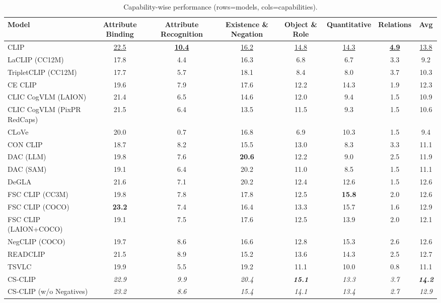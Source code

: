 \begin{table}[t]
  \centering
  \scriptsize
  \caption{Capability-wise performance (rows=models, cols=capabilities).}
  \label{tab:caps_models_rows}
  \begin{adjustbox}{max width=\textwidth}
  \setlength{\tabcolsep}{2pt}
  \begin{tabular}{p{5.0cm}ccccccc}
    \toprule
    Model & Attribute Binding & Attribute Recognition & Existence \& Negation & Object \& Role & Quantitative & Relations & Avg \\
    \midrule
    CLIP & \underline{22.5} & \textbf{\underline{10.4}} & \underline{16.2} & \underline{14.8} & \underline{14.3} & \textbf{\underline{4.9}} & \underline{13.8} \\
    \midrule
    LaCLIP (CC12M) & 17.8 & 4.4 & 16.3 & 6.8 & 6.7 & 3.3 & 9.2 \\
    TripletCLIP (CC12M) & 17.7 & 5.7 & 18.1 & 8.4 & 8.0 & 3.7 & 10.3 \\
    \midrule
    CE CLIP & 19.6 & 7.9 & 17.6 & 12.2 & 14.3 & 1.9 & 12.3 \\
    CLIC CogVLM (LAION) & 21.4 & 6.5 & 14.6 & 12.0 & 9.4 & 1.5 & 10.9 \\
    CLIC CogVLM (PixPR RedCaps) & 21.5 & 6.4 & 13.5 & 11.5 & 9.3 & 1.5 & 10.6 \\
    CLoVe & 20.0 & 0.7 & 16.8 & 6.9 & 10.3 & 1.5 & 9.4 \\
    CON CLIP & 18.7 & 8.2 & 15.5 & 13.0 & 8.3 & 3.3 & 11.1 \\
    DAC (LLM) & 19.8 & 7.6 & \textbf{20.6} & 12.2 & 9.0 & 2.5 & 11.9 \\
    DAC (SAM) & 19.1 & 6.4 & 20.2 & 11.0 & 8.5 & 1.5 & 11.1 \\
    DeGLA & 21.6 & 7.1 & 20.2 & 12.4 & 12.6 & 1.5 & 12.6 \\
    FSC CLIP (CC3M) & 19.8 & 7.8 & 17.8 & 12.5 & \textbf{15.8} & 2.0 & 12.6 \\
    FSC CLIP (COCO) & \textbf{23.2} & 7.4 & 16.4 & 13.3 & 15.7 & 1.6 & 12.9 \\
    FSC CLIP (LAION+COCO) & 19.1 & 7.5 & 17.6 & 12.5 & 13.9 & 2.0 & 12.1 \\
    NegCLIP (COCO) & 19.7 & 8.6 & 16.6 & 12.8 & 15.3 & 2.6 & 12.6 \\
    READCLIP & 21.5 & 8.9 & 15.2 & 13.6 & 14.3 & 2.5 & 12.7 \\
    TSVLC & 19.9 & 5.5 & 19.2 & 11.1 & 10.0 & 0.8 & 11.1 \\
    \midrule
    CS-CLIP & \emph{22.9} & \emph{9.9} & \emph{20.4} & \textbf{\emph{15.1}} & \emph{13.3} & \emph{3.7} & \textbf{\emph{14.2}} \\
    CS-CLIP (w/o Negatives) & \emph{23.2} & \emph{8.6} & \emph{15.4} & \emph{14.1} & \emph{13.4} & \emph{2.7} & \emph{12.9} \\
    \bottomrule
  \end{tabular}
  \end{adjustbox}
\end{table}